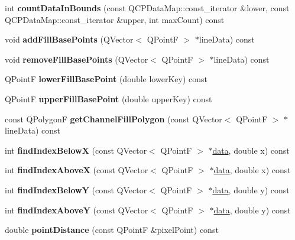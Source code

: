 \begin{DoxyCompactItemize}
int {\bfseries count\+Data\+In\+Bounds} (const Q\+C\+P\+Data\+Map\+::const\+\_\+iterator \&lower, const Q\+C\+P\+Data\+Map\+::const\+\_\+iterator \&upper, int max\+Count) const
\item 
\mbox{\label{class_q_c_p_graph_a8e517dcd3baba1b41daed0248841c092}} 
void {\bfseries add\+Fill\+Base\+Points} (Q\+Vector$<$ Q\+PointF $>$ $\ast$line\+Data) const
\item 
\mbox{\label{class_q_c_p_graph_aff2ae149f6d319fc3ed2c7c6fb348553}} 
void {\bfseries remove\+Fill\+Base\+Points} (Q\+Vector$<$ Q\+PointF $>$ $\ast$line\+Data) const
\item 
\mbox{\label{class_q_c_p_graph_ace7c17a07e9aa824853e469816a5aa1c}} 
Q\+PointF {\bfseries lower\+Fill\+Base\+Point} (double lower\+Key) const
\item 
\mbox{\label{class_q_c_p_graph_a7a255fc7260d96ed6f9d972839941f93}} 
Q\+PointF {\bfseries upper\+Fill\+Base\+Point} (double upper\+Key) const
\item 
\mbox{\label{class_q_c_p_graph_add26655bd2338adaa7fc99e27bd06550}} 
const Q\+PolygonF {\bfseries get\+Channel\+Fill\+Polygon} (const Q\+Vector$<$ Q\+PointF $>$ $\ast$line\+Data) const
\item 
\mbox{\label{class_q_c_p_graph_a8c3f15dd5a06633011a6ef36016d308b}} 
int {\bfseries find\+Index\+BelowX} (const Q\+Vector$<$ Q\+PointF $>$ $\ast$\mbox{\hyperlink{class_q_c_p_graph_acde1c0d1f6a817930489548396e6b3e6}{data}}, double x) const
\item 
\mbox{\label{class_q_c_p_graph_aaabd6c6a7200a2672c44e62bd2a1cafa}} 
int {\bfseries find\+Index\+AboveX} (const Q\+Vector$<$ Q\+PointF $>$ $\ast$\mbox{\hyperlink{class_q_c_p_graph_acde1c0d1f6a817930489548396e6b3e6}{data}}, double x) const
\item 
\mbox{\label{class_q_c_p_graph_a5b0291f248e8ca8eaa82833ab420dcd0}} 
int {\bfseries find\+Index\+BelowY} (const Q\+Vector$<$ Q\+PointF $>$ $\ast$\mbox{\hyperlink{class_q_c_p_graph_acde1c0d1f6a817930489548396e6b3e6}{data}}, double y) const
\item 
\mbox{\label{class_q_c_p_graph_a8b952a5f937840dc242489585cc8000d}} 
int {\bfseries find\+Index\+AboveY} (const Q\+Vector$<$ Q\+PointF $>$ $\ast$\mbox{\hyperlink{class_q_c_p_graph_acde1c0d1f6a817930489548396e6b3e6}{data}}, double y) const
\item 
\mbox{\label{class_q_c_p_graph_a96146099a5e68f49c7326a765f768da2}} 
double {\bfseries point\+Distance} (const Q\+PointF \&pixel\+Point) const
\end{DoxyCompactItemize}
